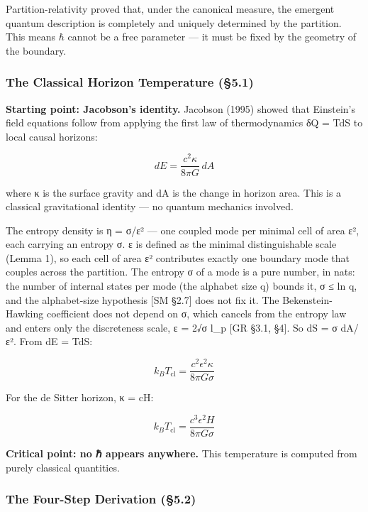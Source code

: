 \documentclass[
]{article}
\begin{document}
Partition-relativity proved that, under the canonical measure, the
emergent quantum description is completely and uniquely determined by
the partition. This means \(\hbar\) cannot be a free parameter --- it
must be fixed by the geometry of the boundary.

\hypertarget{the-classical-horizon-temperature-5.1}{%
\subsubsection{The Classical Horizon Temperature
(§5.1)}\label{the-classical-horizon-temperature-5.1}}

\textbf{Starting point: Jacobson's identity.} Jacobson (1995) showed
that Einstein's field equations follow from applying the first law of
thermodynamics δQ = TdS to local causal horizons:

\[dE = \frac{c^2 \kappa}{8\pi G} \, dA\]

where κ is the surface gravity and dA is the change in horizon area.
This is a classical gravitational identity --- no quantum mechanics
involved.

The entropy density is η = σ/ε² --- one coupled mode per minimal cell of
area ε², each carrying an entropy σ. ε is defined as the minimal
distinguishable scale (Lemma 1), so each cell of area ε² contributes
exactly one boundary mode that couples across the partition. The entropy
σ of a mode is a pure number, in nats: the number of internal states per
mode (the alphabet size q) bounds it, σ ≤ ln q, and the alphabet-size
hypothesis {[}SM §2.7{]} does not fix it. The Bekenstein-Hawking
coefficient does not depend on σ, which cancels from the entropy law and
enters only the discreteness scale, ε = 2√σ l\_p {[}GR §3.1, §4{]}. So
dS = σ dA/ε². From dE = TdS:

\[k_B T_{\text{cl}} = \frac{c^2 \epsilon^2 \kappa}{8\pi G \sigma}\]

For the de Sitter horizon, κ = cH:

\[k_B T_{\text{cl}} = \frac{c^3 \epsilon^2 H}{8\pi G \sigma}\]

\textbf{Critical point: no ℏ appears anywhere.} This temperature is
computed from purely classical quantities.

\hypertarget{the-four-step-derivation-5.2}{%
\subsubsection{The Four-Step Derivation
(§5.2)}\label{the-four-step-derivation-5.2}}
\end{document}
